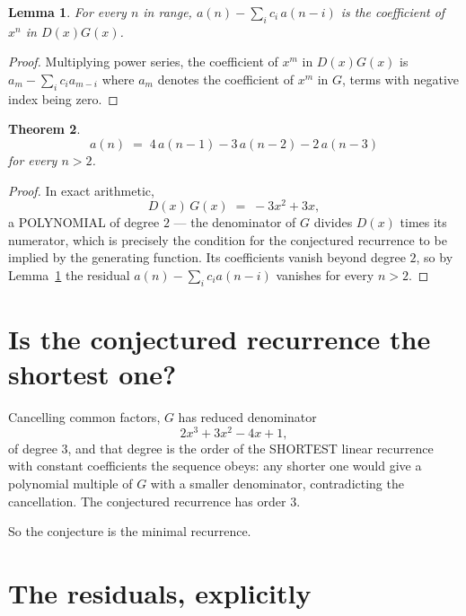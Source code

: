 \documentclass[11pt,a4paper]{article}
\theoremstyle{plain}
\newtheorem{theorem}{Theorem}
\newtheorem{lemma}[theorem]{Lemma}
\theoremstyle{definition}
\begin{document}
\begin{lemma}\label{lem:key}
For every $n$ in range, $a(n)-\sum_i c_i\,a(n-i)$ is the coefficient of $x^{n}$ in
$D(x)G(x)$.
\end{lemma}

\begin{proof}
Multiplying power series, the coefficient of $x^{m}$ in $D(x)G(x)$ is
$a_m-\sum_i c_i a_{m-i}$ where $a_m$ denotes the coefficient of $x^{m}$ in $G$, terms with
negative index being zero.
\end{proof}

\begin{theorem}
\[
a(n)\;=\;4\,a(n-1) - 3\,a(n-2) - 2\,a(n-3)
\]
for every $n>2$.
\end{theorem}

\begin{proof}
In exact arithmetic,
\[
D(x)\,G(x)\;=\;- 3 x^{2} + 3 x,
\]
a POLYNOMIAL of degree $2$ --- the denominator of $G$ divides $D(x)$ times its numerator,
which is precisely the condition for the conjectured recurrence to be implied by the
generating function. Its coefficients vanish beyond degree $2$, so by
Lemma~\ref{lem:key} the residual $a(n)-\sum_ic_ia(n-i)$ vanishes for every
$n>2$.
\end{proof}

\section{Is the conjectured recurrence the shortest one?}

Cancelling common factors, $G$ has reduced denominator
\[
2 x^{3} + 3 x^{2} - 4 x + 1,
\]
of degree $3$, and that degree is the order of the SHORTEST linear recurrence with
constant coefficients the sequence obeys: any shorter one would give a polynomial multiple of
$G$ with a smaller denominator, contradicting the cancellation. The conjectured recurrence has
order $3$.

So the conjecture is the minimal recurrence.

\section{The residuals, explicitly}
\end{document}
